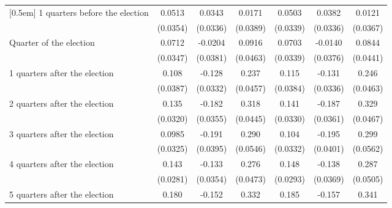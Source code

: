 \begin{table}[!ht]
\begin{tabular}{l*{6}{c}}
[0.5em]
 1 quarters before the election&      0.0513         &      0.0343         &      0.0171         &      0.0503         &      0.0382         &      0.0121         \\
                    &    (0.0354)         &    (0.0336)         &    (0.0389)         &    (0.0339)         &    (0.0336)         &    (0.0367)         \\
[0.5em]
Quarter of the election&      0.0712\sym{*}  &     -0.0204         &      0.0916\sym{*}  &      0.0703\sym{*}  &     -0.0140         &      0.0844         \\
                    &    (0.0347)         &    (0.0381)         &    (0.0463)         &    (0.0339)         &    (0.0376)         &    (0.0441)         \\
[0.5em]
 1 quarters after the election&       0.108\sym{**} &      -0.128\sym{***}&       0.237\sym{***}&       0.115\sym{**} &      -0.131\sym{***}&       0.246\sym{***}\\
                    &    (0.0387)         &    (0.0332)         &    (0.0457)         &    (0.0384)         &    (0.0336)         &    (0.0463)         \\
[0.5em]
 2 quarters after the election&       0.135\sym{***}&      -0.182\sym{***}&       0.318\sym{***}&       0.141\sym{***}&      -0.187\sym{***}&       0.329\sym{***}\\
                    &    (0.0320)         &    (0.0355)         &    (0.0445)         &    (0.0330)         &    (0.0361)         &    (0.0467)         \\
[0.5em]
 3 quarters after the election&      0.0985\sym{**} &      -0.191\sym{***}&       0.290\sym{***}&       0.104\sym{**} &      -0.195\sym{***}&       0.299\sym{***}\\
                    &    (0.0325)         &    (0.0395)         &    (0.0546)         &    (0.0332)         &    (0.0401)         &    (0.0562)         \\
[0.5em]
 4 quarters after the election&       0.143\sym{***}&      -0.133\sym{***}&       0.276\sym{***}&       0.148\sym{***}&      -0.138\sym{***}&       0.287\sym{***}\\
                    &    (0.0281)         &    (0.0354)         &    (0.0473)         &    (0.0293)         &    (0.0369)         &    (0.0505)         \\
[0.5em]
 5 quarters after the election&       0.180\sym{***}&      -0.152\sym{***}&       0.332\sym{***}&       0.185\sym{***}&      -0.157\sym{***}&       0.341\sym{***}\\

\end{tabular}
\end{table}
